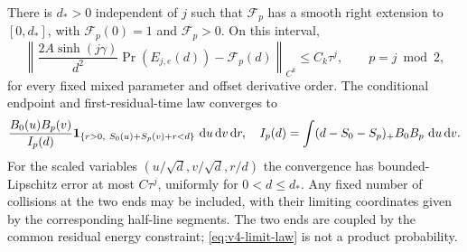 \begin{theorem}\label{thm:v4-law}
There is $d_*>0$ independent of $j$ such that $\mathcal F_p$ has a
smooth right extension to $[0,d_*]$, with $\mathcal F_p(0)=1$ and
$\mathcal F_p>0$. On this interval,
\begin{equation}\label{eq:v4-F-convergence}
 \left\|\frac{2A\sinh(j\gamma)}{d^2}\Pr(E_{j,e}(d))
                   -\mathcal F_p(d)\right\|_{C^k}
 \le C_k\tau^j,\qquad p=j\bmod2,
\end{equation}
for every fixed mixed parameter and offset derivative order.
The conditional endpoint and first-residual-time law converges to
\begin{equation}\label{eq:v4-limit-law}
 \frac{B_0(u)B_p(v)}{I_p(d)}
 \mathbf1_{\{r>0,\ S_0(u)+S_p(v)+r<d\}}\,\,\mathrm d u\,\mathrm d v\,\mathrm d r,
 \quad I_p(d)=\int(d-S_0-S_p)_+B_0B_p\,\,\mathrm d u\,\mathrm d v.
\end{equation}
For the scaled variables $(u/\sqrt d,v/\sqrt d,r/d)$ the convergence
has bounded-Lipschitz error at most $C\tau^j$, uniformly for
$0<d\le d_*$. Any fixed number of collisions at the two ends may be
included, with their limiting coordinates given by the corresponding
half-line segments. The two ends are coupled by the common residual
energy constraint; \eqref{eq:v4-limit-law} is not a product probability.
\end{theorem}
